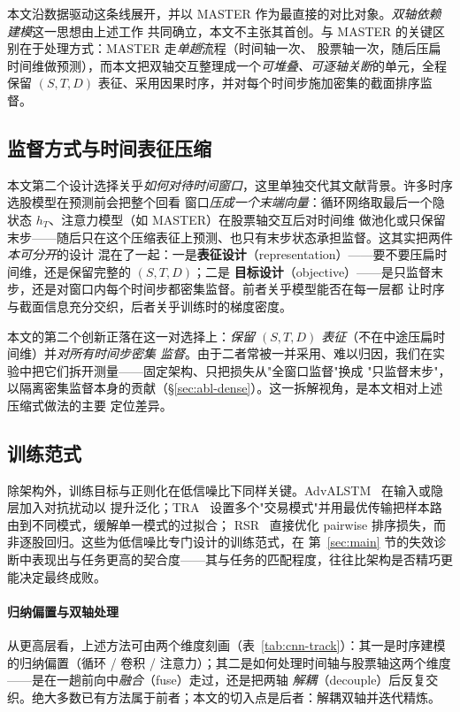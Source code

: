 \documentclass[a4paper,11pt,fontset=fandol]{ctexart}
\begin{document}
本文沿数据驱动这条线展开，并以 MASTER 作为最直接的对比对象。\emph{双轴依赖建模}这一思想由上述工作
共同确立，本文不主张其首创。与 MASTER 的关键区别在于处理方式：MASTER 走\emph{单趟}流程（时间轴一次、
股票轴一次，随后压扁时间维做预测），而本文把双轴交互整理成一个\emph{可堆叠、可逐轴关断}的单元，全程
保留 $(S,T,D)$ 表征、采用因果时序，并对每个时间步施加密集的截面排序监督。

\subsection{监督方式与时间表征压缩}\label{sec:rw-sup}
本文第二个设计选择关乎\emph{如何对待时间窗口}，这里单独交代其文献背景。许多时序选股模型在预测前会把整个回看
窗口\emph{压成一个末端向量}：循环网络取最后一个隐状态 $h_T$、注意力模型（如 MASTER）在股票轴交互后对时间维
做池化或只保留末步——随后只在这个压缩表征上预测、也只有末步状态承担监督。这其实把两件\emph{本可分开}的设计
混在了一起：一是\textbf{表征设计}（representation）——要不要压扁时间维，还是保留完整的 $(S,T,D)$；二是
\textbf{目标设计}（objective）——是只监督末步，还是对窗口内每个时间步都密集监督。前者关乎模型能否在每一层都
让时序与截面信息充分交织，后者关乎训练时的梯度密度。

本文的第二个创新正落在这一对选择上：\emph{保留 $(S,T,D)$ 表征}（不在中途压扁时间维）并\emph{对所有时间步密集
监督}。由于二者常被一并采用、难以归因，我们在实验中把它们拆开测量——固定架构、只把损失从"全窗口监督"换成
"只监督末步"，以隔离密集监督本身的贡献（§\ref{sec:abl-dense}）。这一拆解视角，是本文相对上述压缩式做法的主要
定位差异。

\subsection{训练范式}\label{sec:rw-train}
除架构外，训练目标与正则化在低信噪比下同样关键。AdvALSTM~\cite{advalstm} 在输入或隐层加入对抗扰动以
提升泛化；TRA~\cite{tra} 设置多个"交易模式"并用最优传输把样本路由到不同模式，缓解单一模式的过拟合；
RSR~\cite{rsr} 直接优化 pairwise 排序损失，而非逐股回归。这些为低信噪比专门设计的训练范式，在
第~\ref{sec:main} 节的失效诊断中表现出与任务更高的契合度——其与任务的匹配程度，往往比架构是否精巧更
能决定最终成败。

\paragraph{归纳偏置与双轴处理}
从更高层看，上述方法可由两个维度刻画（表~\ref{tab:cnn-track}）：其一是时序建模的归纳偏置（循环 / 卷积
/ 注意力）；其二是如何处理时间轴与股票轴这两个维度——是在一趟前向中\emph{融合}（fuse）走过，还是把两轴
\emph{解耦}（decouple）后反复交织。绝大多数已有方法属于前者；本文的切入点是后者：解耦双轴并迭代精炼。
\end{document}
